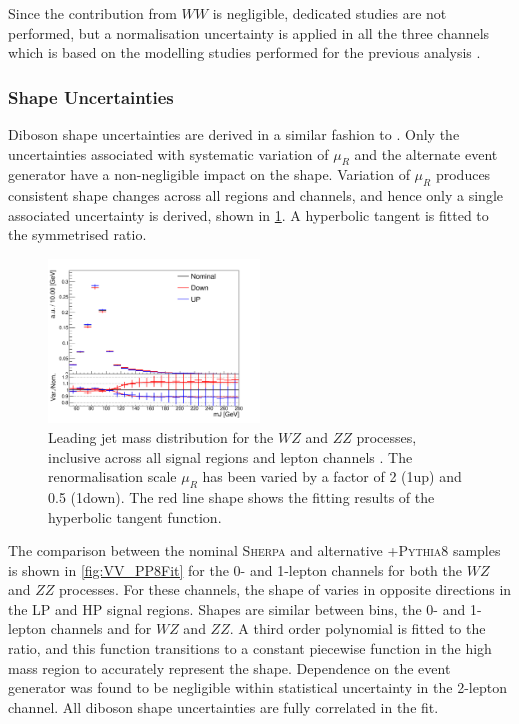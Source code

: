 Since the contribution from $WW$ is negligible, dedicated studies are not performed, but a  normalisation uncertainty is applied in all the three channels which is based on the modelling studies performed for the previous analysis \cite{HIGG-2018-04}.



\subsubsection{Shape Uncertainties}

Diboson shape uncertainties are derived in a similar fashion to \Vjets.
Only the uncertainties associated with systematic variation of $\mu_R$ and the alternate event generator have a non-negligible impact on the \mJ shape.
Variation of $\mu_R$ produces consistent \mJ shape changes across all regions and channels, and hence only a single associated uncertainty is derived, shown in \cref{fig:VV_muRFit}.
A hyperbolic tangent is fitted to the symmetrised ratio.

\begin{figure}[!htbp]
  \centering
  \includegraphics[width=0.5\textwidth]{chapters/6.vhbb_boosted/figs/012L_VV_2tag1pfat0pjet_ptvinc_SR_noaddbjetsr_mJIncl_SysMUR.pdf}
  \caption{
    Leading \largeR jet mass distribution for the $WZ$ and $ZZ$ processes, inclusive across all signal regions and lepton channels \cite{Dao:2688371}.
    The renormalisation scale $\mu_R$ has been varied by a factor of 2 (1up) and 0.5 (1down).
    The red line shape shows the fitting results of the hyperbolic tangent function.
  }
  \label{fig:VV_muRFit}
\end{figure}


The comparison between the nominal \textsc{Sherpa} and alternative \POWHEG{}+\textsc{Pythia8} samples is shown in \cref{fig:VV_PP8Fit} for the 0- and 1-lepton channels for both the $WZ$ and $ZZ$ processes.
For these channels, the shape of \mJ varies in opposite directions in the LP and HP signal regions.
Shapes are similar between \ptv bins, the 0- and 1-lepton channels and for $WZ$ and $ZZ$.
A third order polynomial is fitted to the ratio, and this function transitions to a constant piecewise function in the high mass region to accurately represent the shape.
Dependence on the event generator was found to be negligible within statistical uncertainty in the 2-lepton channel.
All diboson shape uncertainties are fully correlated in the fit.

